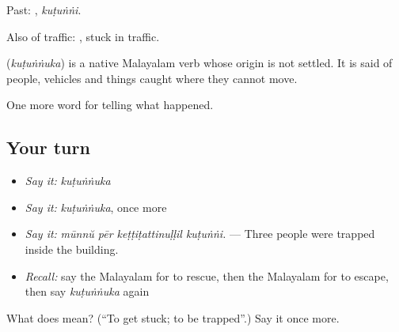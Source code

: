 Past: , \emph{kuṭuṅṅi}.

Also of traffic:  , stuck in traffic.

\begin{cousinweb}
\textbf{} (\emph{kuṭuṅṅuka}) is a native Malayalam verb whose origin is not settled. It is said of people, vehicles and things caught where they cannot move.
\end{cousinweb}

\begin{grammarlens}[title={What you've built}]
One more word for telling what happened.
\end{grammarlens}

\subsection*{Your turn}
\begin{itemize}
\raggedright
  \item \emph{Say it:} \emph{kuṭuṅṅuka}
  \item \emph{Say it:} \emph{kuṭuṅṅuka}, once more
  \item \emph{Say it:} \emph{mūnnŭ pēr keṭṭiṭattinuḷḷil kuṭuṅṅi.} — Three people were trapped inside the building.
  \item \emph{Recall:} say the Malayalam for to rescue, then the Malayalam for to escape, then say \emph{kuṭuṅṅuka} again
\end{itemize}

\begin{tcolorbox}[breakable,colback=teal!4,colframe=teal!35!black,title={Before you move on}]
What does  mean? (\textquotedblleft{}To get stuck; to be trapped\textquotedblright{}.) Say it once more.
\end{tcolorbox}
